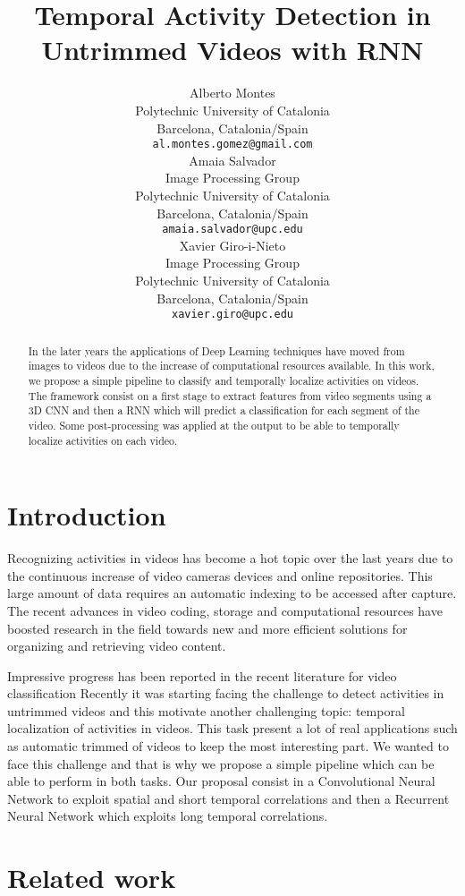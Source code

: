 \documentclass{article}
\title{Temporal Activity Detection in Untrimmed Videos with RNN}
\author{
    Alberto Montes \\
    Polytechnic University of Catalonia \\
    Barcelona, Catalonia/Spain \\
    \texttt{al.montes.gomez@gmail.com} \\
    \And
    Amaia Salvador \\
    Image Processing Group \\
    Polytechnic University of Catalonia \\
    Barcelona, Catalonia/Spain \\
    \texttt{amaia.salvador@upc.edu} \\
    \And
    Xavier Giro-i-Nieto \\
    Image Processing Group \\
    Polytechnic University of Catalonia \\
    Barcelona, Catalonia/Spain \\
    \texttt{xavier.giro@upc.edu} \\
}
\begin{document}

\maketitle

\begin{abstract}

    In the later years the applications of Deep Learning techniques have moved from images to videos due to the increase of computational resources available. In this work, we propose a simple pipeline to classify and temporally localize activities on videos. The framework consist on a first stage to extract features from video segments using a 3D CNN and then a RNN which will predict a classification for each segment of the video. Some post-processing was applied at the output to be able to temporally localize activities on each video.

\end{abstract}

\section{Introduction}

Recognizing activities in videos has become a hot topic over the last years due to the continuous increase of video cameras devices and online repositories.
This large amount of data requires an automatic indexing to be accessed after capture.
The recent advances in video coding, storage and computational resources have boosted research in the field towards new and more efficient solutions for organizing and retrieving video content.

Impressive progress has been reported in the recent literature for video classification %
Recently it was starting facing the challenge to detect activities in untrimmed videos and this motivate another challenging topic: temporal localization of activities in videos.
This task present a lot of real applications such as automatic trimmed of videos to keep the most interesting part.
We wanted to face this challenge and that is why we propose a simple pipeline which can be able to perform in both tasks. Our proposal consist in a Convolutional Neural Network to exploit spatial and short temporal correlations and then a Recurrent Neural Network which exploits long temporal correlations.

\section{Related work}
\end{document}
